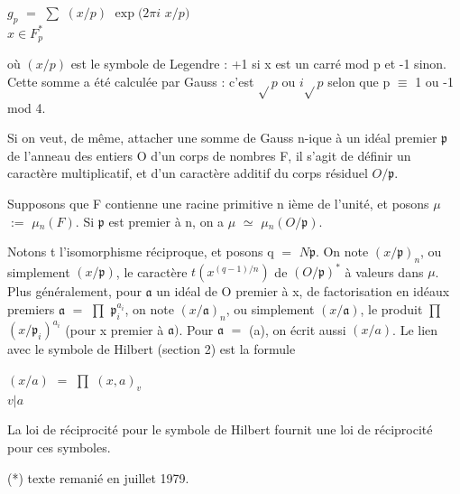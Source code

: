 \documentclass[10pt,a4paper]{article}
\begin{document}
\par\smallskip\begin{center}\begin{minipage}{0.96\textwidth}\centering
$g_p$ $=$ $\sum{}$ $(x/p)$ $\exp(2\pi{}i$ $x/p)$ \\ $x\in{}F_p^*$
\end{minipage}\end{center}\smallskip
\par où $(x/p)$ est le symbole de Legendre : +1 si x est un carré mod p et -1 sinon. Cette somme a été calculée par Gauss : c'est $\sqrt{}p$ ou $i\sqrt{}p$ selon que p $\equiv{}$ 1 ou -1 mod 4.\par
\par Si on veut, de même, attacher une somme de Gauss n-ique à un idéal premier $\mathfrak{p}$ de l'anneau des entiers O d'un corps de nombres F, il s'agit de définir un caractère multiplicatif, et d'un caractère additif du corps résiduel $O/\mathfrak{p}$.\par
\par Supposons que F contienne une racine primitive n ième de l'unité, et posons $\mu{}$ $:=$ $\mu{}_n(F)$. Si $\mathfrak{p}$ est premier à n, on a $\mu{}$ $\simeq{}$ $\mu{}_n(O/\mathfrak{p})$.\par
\par Notons t l'isomorphisme réciproque, et posons q $=$ $N\mathfrak{p}$. On note $(x/\mathfrak{p})_n$, ou simplement $(x/\mathfrak{p})$, le caractère $t(x^{(q-1)/n})$ de $(O/\mathfrak{p})^*$ à valeurs dans $\mu{}$. Plus généralement, pour $\mathfrak{a}$ un idéal de O premier à x, de factorisation en idéaux premiers $\mathfrak{a}$ $=$ $\prod{}$ $\mathfrak{p}_i^{a_i}$, on note $(x/\mathfrak{a})_n$, ou simplement $(x/\mathfrak{a})$, le produit $\prod{}$ $(x/\mathfrak{p}_i)^{a_i}$ (pour x premier à $\mathfrak{a})$. Pour $\mathfrak{a}$ $=$ (a), on écrit aussi $(x/a)$. Le lien avec le symbole de Hilbert (section 2) est la formule\par
\par\smallskip\begin{center}\begin{minipage}{0.96\textwidth}\centering
$(x/a)$ $=$ $\prod{}$ $(x,a)_v$ \\ $v|a$
\end{minipage}\end{center}\smallskip
\par La loi de réciprocité pour le symbole de Hilbert fournit une loi de réciprocité pour ces symboles.\par
\par (*) texte remanié en juillet 1979.\par
\end{document}

